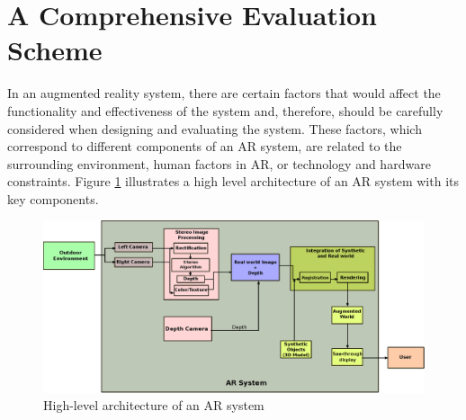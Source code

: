 
\section{A Comprehensive Evaluation Scheme}

In an augmented reality system, there are certain factors that would affect the functionality and effectiveness of the system \cite{liv05,kru10} and, therefore, 
should be carefully considered when designing and evaluating the system.
These factors, which correspond to different components of an AR system, are related to the surrounding 
environment, human factors in AR, or technology and hardware constraints.
Figure \ref{fig:AR} illustrates a high level architecture of an AR system with its key components.

\begin{figure}[H]
\centering
\includegraphics[scale=0.75]{AR}
\caption{High-level architecture of an AR system}
\label{fig:AR}
\end{figure} 

